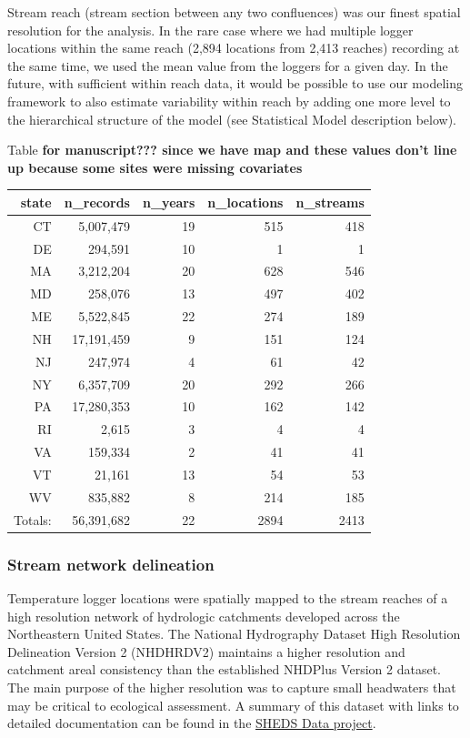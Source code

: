 \documentclass[]{article}
\begin{document}
Stream reach (stream section between any two confluences) was our finest
spatial resolution for the analysis. In the rare case where we had
multiple logger locations within the same reach (2,894 locations from
2,413 reaches) recording at the same time, we used the mean value from
the loggers for a given day. In the future, with sufficient within reach
data, it would be possible to use our modeling framework to also
estimate variability within reach by adding one more level to the
hierarchical structure of the model (see Statistical Model description
below).

Table \textbf{for manuscript??? since we have map and these values don't
line up because some sites were missing covariates}

\begin{longtable}[]{@{}rrrrr@{}}
\toprule
state & n\_records & n\_years & n\_locations & n\_streams\tabularnewline
\midrule
\endhead
CT & 5,007,479 & 19 & 515 & 418\tabularnewline
DE & 294,591 & 10 & 1 & 1\tabularnewline
MA & 3,212,204 & 20 & 628 & 546\tabularnewline
MD & 258,076 & 13 & 497 & 402\tabularnewline
ME & 5,522,845 & 22 & 274 & 189\tabularnewline
NH & 17,191,459 & 9 & 151 & 124\tabularnewline
NJ & 247,974 & 4 & 61 & 42\tabularnewline
NY & 6,357,709 & 20 & 292 & 266\tabularnewline
PA & 17,280,353 & 10 & 162 & 142\tabularnewline
RI & 2,615 & 3 & 4 & 4\tabularnewline
VA & 159,334 & 2 & 41 & 41\tabularnewline
VT & 21,161 & 13 & 54 & 53\tabularnewline
WV & 835,882 & 8 & 214 & 185\tabularnewline
Totals: & 56,391,682 & 22 & 2894 & 2413\tabularnewline
\bottomrule
\end{longtable}

\subsubsection{Stream network
delineation}\label{stream-network-delineation}

Temperature logger locations were spatially mapped to the stream reaches
of a high resolution network of hydrologic catchments developed across
the Northeastern United States. The National Hydrography Dataset High
Resolution Delineation Version 2 (NHDHRDV2) maintains a higher
resolution and catchment areal consistency than the established NHDPlus
Version 2 dataset. The main purpose of the higher resolution was to
capture small headwaters that may be critical to ecological assessment.
A summary of this dataset with links to detailed documentation can be
found in the \href{http://conte-ecology.github.io/shedsGISData/}{SHEDS
Data project}.
\end{document}
